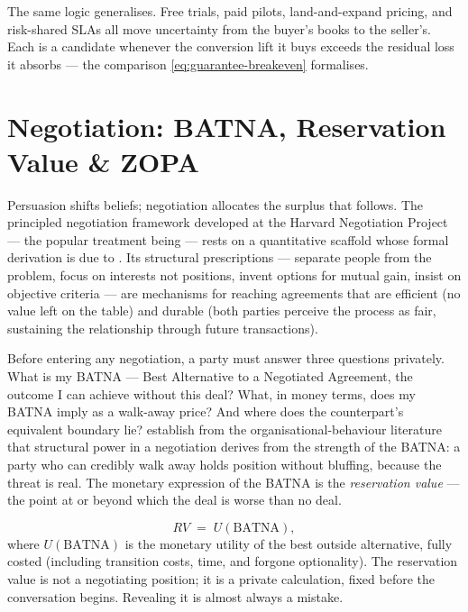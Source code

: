 The same logic generalises. Free trials, paid pilots, land-and-expand pricing, and risk-shared SLAs all move uncertainty from the buyer's books to the seller's. Each is a candidate whenever the conversion lift it buys exceeds the residual loss it absorbs --- the comparison \cref{eq:guarantee-breakeven} formalises.

\section{Negotiation: BATNA, Reservation Value \& ZOPA}\label{sec:negotiation}

Persuasion shifts beliefs; negotiation allocates the surplus that follows. The principled
negotiation framework developed at the Harvard Negotiation Project --- the popular
treatment being \textcite{fisher2011getting} --- rests on a quantitative scaffold whose
formal derivation is due to \textcite{raiffa1982art}. Its structural prescriptions ---
separate people from the problem, focus on interests not positions, invent options for
mutual gain, insist on objective criteria --- are mechanisms for reaching agreements that
are efficient (no value left on the table) and durable (both parties perceive the process
as fair, sustaining the relationship through future transactions).

Before entering any negotiation, a party must answer three questions privately. What is
my BATNA --- Best Alternative to a Negotiated Agreement, the outcome I can achieve without
this deal? What, in money terms, does my BATNA imply as a walk-away price? And where does
the counterpart's equivalent boundary lie? \textcite{kim2005power} establish from the
organisational-behaviour literature that structural power in a negotiation derives from the
strength of the BATNA: a party who can credibly walk away holds position without bluffing,
because the threat is real.
The monetary expression of the BATNA is the \emph{reservation value} --- the point at or
beyond which the deal is worse than no deal.

\begin{equation}\label{eq:reservation}
  RV \;=\; U(\mathrm{BATNA}),
\end{equation}
where \(U(\mathrm{BATNA})\) is the monetary utility of the best outside alternative, fully
costed (including transition costs, time, and forgone optionality). The reservation value
is not a negotiating position; it is a private calculation, fixed before the conversation
begins. Revealing it is almost always a mistake.

